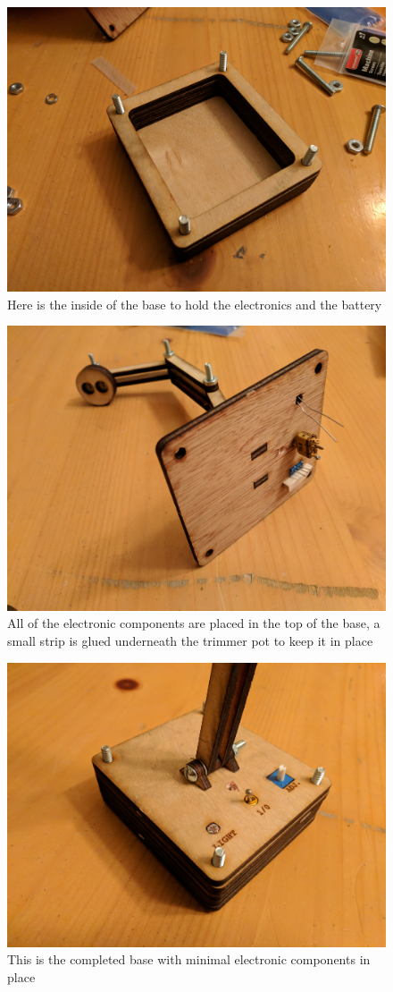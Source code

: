 \documentclass[a4paper]{article}
\begin{document}
\begin{figure}[h!]
\centerline{\includegraphics[width=.75\linewidth]{lamp9.jpg}}
\caption{Here is the inside of the base to hold the electronics and the battery}
\end{figure}

\begin{figure}[h!]
\centerline{\includegraphics[width=.75\linewidth]{lamp10.jpg}}
\caption{All of the electronic components are placed in the top of the base, a small strip is glued underneath the trimmer pot to keep it in place}
\end{figure}

\begin{figure}[h!]
\centerline{\includegraphics[width=.75\linewidth]{lamp12.jpg}}
\caption{This is the completed base with minimal electronic components in place}
\end{figure}
\end{document}
